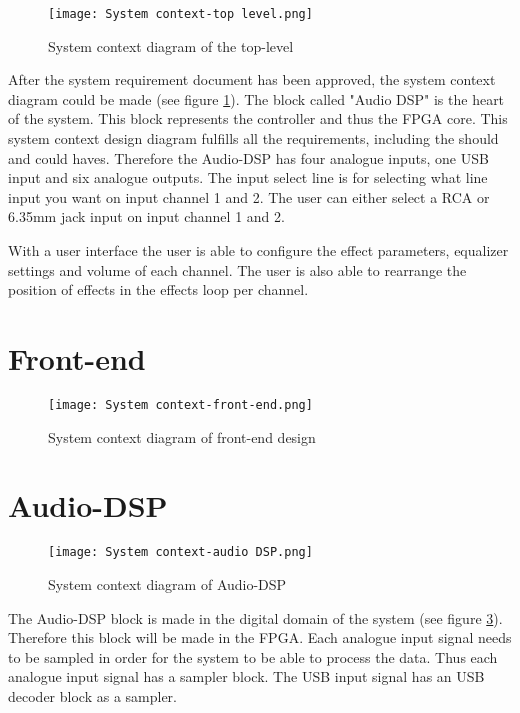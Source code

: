\begin{figure}[ht]
    \texttt{[image: System context-top level.png]}
    \caption{System context diagram of the top-level}
    \label{fig:sys-context-top}
\end{figure}

After the system requirement document has been approved, the system context diagram could be made (see figure \ref{fig:sys-context-top}). The block called "Audio DSP" is the heart of the system. This block represents the controller and thus the FPGA core. This system context design diagram fulfills all the requirements, including the should and could haves. Therefore the Audio-DSP has four analogue inputs, one USB input and six analogue outputs. The input select line is for selecting what line input you want on input channel 1 and 2. The user can either select a RCA or 6.35mm jack input on input channel 1 and 2.

With a user interface the user is able to configure the effect parameters, equalizer settings and volume of each channel. The user is also able to rearrange the position of effects in the effects loop per channel.

\section{Front-end}
\begin{figure}[ht]
    \texttt{[image: System context-front-end.png]}
    \caption{System context diagram of front-end design}
    \label{fig:system-context-front-end}
\end{figure}

\section{Audio-DSP}
\begin{figure}[ht]
    \texttt{[image: System context-audio DSP.png]}
    \caption{System context diagram of Audio-DSP}
    \label{fig:sys-context-audio-dsp}
\end{figure}

The Audio-DSP block is made in the digital domain of the system (see figure \ref{fig:sys-context-audio-dsp}). Therefore this block will be made in the FPGA. Each analogue input signal needs to be sampled in order for the system to be able to process the data. Thus each analogue input signal has a sampler block. The USB input signal has an USB decoder block as a sampler. 

